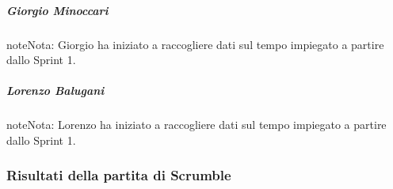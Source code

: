 \documentclass[letterpaper,10pt,italian]{sphinxmanual}
\begin{document}
\subparagraph{Giorgio Minoccari}
\label{\detokenize{development/sprint0/index:giorgio-minoccari}}
\begin{sphinxadmonition}{note}{Nota:}
\sphinxAtStartPar
Giorgio ha iniziato a raccogliere dati sul tempo impiegato a partire dallo Sprint 1.
\end{sphinxadmonition}


\subparagraph{Lorenzo Balugani}
\label{\detokenize{development/sprint0/index:lorenzo-balugani}}
\begin{sphinxadmonition}{note}{Nota:}
\sphinxAtStartPar
Lorenzo ha iniziato a raccogliere dati sul tempo impiegato a partire dallo Sprint 1.
\end{sphinxadmonition}


\subsubsection{Risultati della partita di Scrumble}
\end{document}
